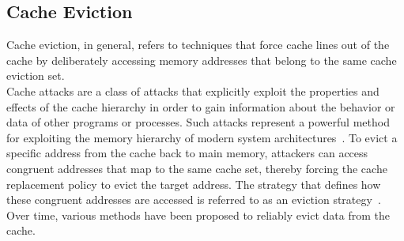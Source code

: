 \subsection{Cache Eviction} \label{subsec:cache-eviction}
    Cache eviction, in general, refers to techniques that force cache lines out of the cache by deliberately 
    accessing memory addresses that belong to the same cache eviction set.
    \\
    Cache attacks are a class of attacks that explicitly exploit the properties and effects of the cache 
    hierarchy in order to gain information about the behavior or data of other programs or processes. Such 
    attacks represent a powerful method for exploiting the memory hierarchy of modern system architectures~\cite{thesisCacheAttacksandRH}. 
    To evict a specific address from the cache back to main memory, attackers can access congruent 
    addresses that map to the same cache set, thereby forcing the cache replacement policy to evict the target 
    address. The strategy that defines how these congruent addresses are accessed is referred to as an eviction 
    strategy~\cite{thesisCacheAttacksandRH}. Over time, various methods have been proposed to reliably evict data from the cache.
    
